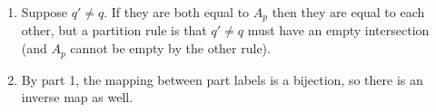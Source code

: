   \begin{enumerate}
    \item Suppose $q' \ne q$. If they are both equal to $A_p$ then they are equal to each other, but a partition rule is that $q' \ne q$ must have an empty intersection (and $A_p$ cannot be empty by the other rule).
    \item By part 1, the mapping between part labels is a bijection, so there is an inverse map as well.
  \end{enumerate}